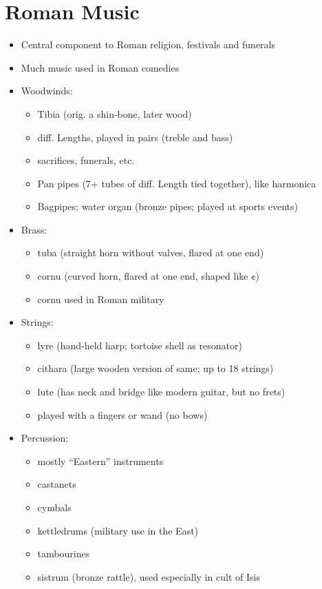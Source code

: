 \documentclass[12pt, twoside]{article}
\begin{document}
\section{Roman Music}
\begin{itemize}
\item Central component to Roman religion, festivals and funerals
\item Much music used in Roman comedies
\item Woodwinds:
	\begin{itemize}
	\item Tibia (orig. a shin-bone, later wood)
	\item diff. Lengths, played in pairs (treble and bass)
	\item sacrifices, funerals, etc.
	\item Pan pipes (7+ tubes of diff. Length tied together), like harmonica
	\item Bagpipes; water organ (bronze pipes; played at sports events)
	\end{itemize}
\item Brass:
	\begin{itemize}
	\item tuba (straight horn without valves, flared at one end)
	\item cornu (curved horn, flared at one end, shaped like ¢)
	\item  cornu used in Roman military
	\end{itemize}
\item Strings:
	\begin{itemize}
	\item lyre (hand-held harp; tortoise shell as resonator)
	\item cithara (large wooden version of same; up to 18 strings)
	\item lute (has neck and bridge like modern guitar, but no frets)
	\item played with a fingers or wand (no bows)
	\end{itemize}
\item Percussion:
	\begin{itemize}
	\item mostly “Eastern” instruments
	\item castanets
	\item cymbals
	\item kettledrums (military use in the East)
	\item tambourines
	\item sistrum (bronze rattle), used especially in cult of Isis

\end{itemize}
\end{itemize}
\end{document}
